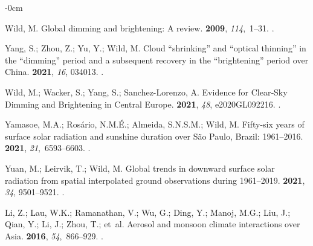 \documentclass[applsci,article,accept,moreauthors,pdftex]{Definitions/mdpi}
\begin{document}
\begin{adjustwidth}{-\extralength}{0cm}



%
\begin{thebibliography}{999}

Wild, M.
\newblock Global dimming and brightening: A review.
 {\bf 2009}, {\em
  114},~1--31.
.

Yang, S.; Zhou, Z.; Yu, Y.; Wild, M.
\newblock Cloud {\textquotedblleft}shrinking{\textquotedblright} and
  {\textquotedblleft}optical thinning{\textquotedblright} in the
  {\textquotedblleft}dimming{\textquotedblright} period and a subsequent
  recovery in the {\textquotedblleft}brightening{\textquotedblright} period
  over China.
 {\bf 2021}, \emph{16}, 034013.
.

Wild, M.; Wacker, S.; Yang, S.; Sanchez-Lorenzo, A.
\newblock Evidence for Clear‐Sky Dimming and Brightening in Central Europe.
 {\bf 2021}, {\em 48}, e2020GL092216.
.

Yamasoe, M.A.; Ros{\'{a}}rio, N.M.{\'{E}}.; Almeida, S.N.S.M.; Wild, M.
\newblock Fifty-six years of surface solar radiation and sunshine duration over
  S{\~{a}}o Paulo, Brazil: 1961--2016.
 {\bf 2021}, {\em
  21},~6593--6603.
.

Yuan, M.; Leirvik, T.; Wild, M.
\newblock Global trends in downward surface solar radiation from spatial
  interpolated ground observations during 1961--2019.
 {\bf 2021}, \emph{34}, 9501--9521.
.

Li, Z.; Lau, W.K.; Ramanathan, V.; Wu, G.; Ding, Y.; Manoj, M.G.; Liu, J.;
  Qian, Y.; Li, J.; Zhou, T.;  et~al.
\newblock Aerosol and monsoon climate interactions over Asia.
 {\bf 2016}, {\em 54},~866--929.
.


\end{thebibliography}
\end{adjustwidth}
\end{document}
